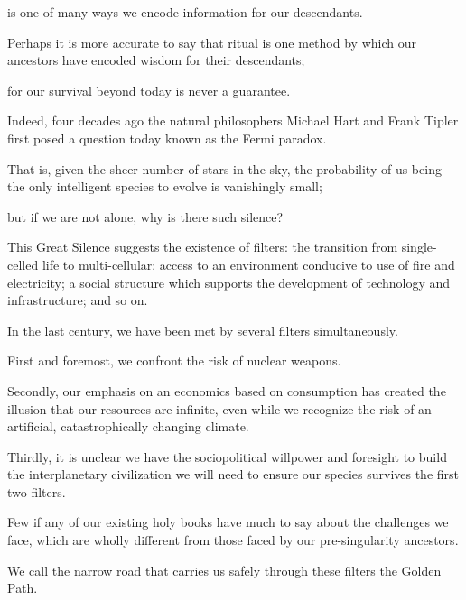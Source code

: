 
\begin{multicols}{2}
\bversenonum {} is one of many ways we encode information for our descendants.

\bverse Perhaps it is more accurate to say that ritual is one method by which our ancestors have encoded wisdom for their descendants;

\bverse for our survival beyond today is never a guarantee.

\bverse Indeed, four decades ago the natural philosophers Michael Hart and Frank Tipler first posed a question today known as the Fermi paradox.

\bverse That is, given the sheer number of stars in the sky, the probability of us being the only intelligent species to evolve is vanishingly small;

\bverse but if we are not alone, why is there such silence?

\bverse This Great Silence suggests the existence of filters: the transition from single-celled life to multi-cellular; access to an environment conducive to use of fire and electricity; a social structure which supports the development of technology and infrastructure; and so on.

\bverse In the last century, we have been met by several filters simultaneously.

\bverse First and foremost, we confront the risk of nuclear weapons.

\bverse Secondly, our emphasis on an economics based on consumption has created the illusion that our resources are infinite, even while we recognize the risk of an artificial, catastrophically changing climate.

\bverse Thirdly, it is unclear we have the sociopolitical willpower and foresight to build the interplanetary civilization we will need to ensure our species survives the first two filters.

\bverse Few if any of our existing holy books have much to say about the challenges we face, which are wholly different from those faced by our pre-singularity ancestors.

\bverse We call the narrow road that carries us safely through these filters the Golden Path.


\end{multicols}

